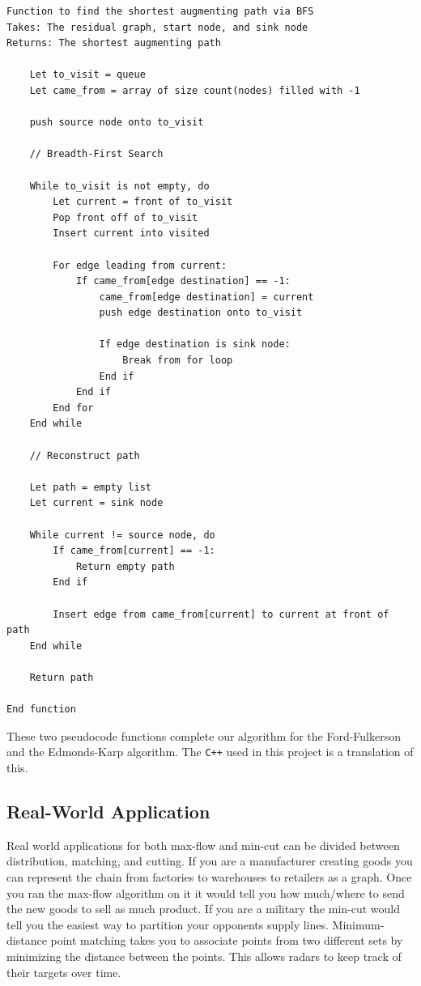 \documentclass[12pt]{amsart}
\begin{document}
\begin{verbatim}
Function to find the shortest augmenting path via BFS
Takes: The residual graph, start node, and sink node
Returns: The shortest augmenting path

    Let to_visit = queue
    Let came_from = array of size count(nodes) filled with -1

    push source node onto to_visit

    // Breadth-First Search

    While to_visit is not empty, do
        Let current = front of to_visit
        Pop front off of to_visit
        Insert current into visited

        For edge leading from current:
            If came_from[edge destination] == -1:
                came_from[edge destination] = current
                push edge destination onto to_visit

                If edge destination is sink node:
                    Break from for loop
                End if
            End if
        End for
    End while

    // Reconstruct path

    Let path = empty list
    Let current = sink node

    While current != source node, do
        If came_from[current] == -1:
            Return empty path
        End if

        Insert edge from came_from[current] to current at front of path
    End while

    Return path

End function

\end{verbatim}

    These two pseudocode functions complete our algorithm for
    the Ford-Fulkerson and the Edmonds-Karp algorithm. The
    \verb|C++| used in this project is a translation of this.

\subsection{Real-World Application}

    Real world applications for both max-flow and min-cut can be
    divided between distribution, matching, and cutting. If you
    are a manufacturer creating goods you can represent the
    chain from factories to warehouses to retailers as a graph.
    Once you ran the max-flow algorithm on it it would tell you
    how much/where to send the new goods to sell as much
    product. If you are a military the min-cut would tell you
    the easiest way to partition your opponents supply lines.
    Minimum-distance point matching takes you to associate
    points from two different sets by minimizing the distance
    between the points. This allows radars to keep track of
    their targets over time.
\end{document}
